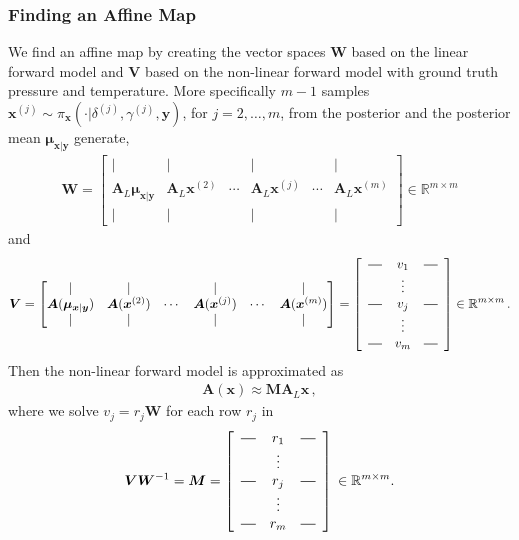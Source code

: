 \documentclass{article}
\begin{document}
\subsubsection{Finding an Affine Map}
\label{sec:affine}
We find an affine map by creating the vector spaces $\bm{W}$ based on the linear forward model and $\bm{V}$ based on the non-linear forward model with ground truth pressure and temperature.
More specifically $m-1$ samples $\bm{x}^{(j)} \sim \pi_{\bm{x}}(\cdot|\delta^{(j)} , \gamma^{(j)},\bm{y})$, for $j = 2, \dots,m$, from the posterior and the posterior mean $\bm{\mu}_{\bm{x}|\bm{y}}$ generate,
\begin{align*}
	\bm{W} = \begin{bmatrix}
		\vert& \vert&   &  \vert & & \vert \\
		\bm{A}_{L}  \bm{\mu}_{\bm{x}|\bm{y}} & \bm{A}_{L}  \bm{x}^{(2)}   &  \cdots& \bm{A}_{L} \bm{x}^{(j)} &  \cdots & \bm{A}_{L} \bm{x}^{(m)} \\
		\vert& \vert&   &  \vert & & \vert 
	\end{bmatrix}
	\in \mathbb{R}^{m \times m}
\end{align*}\noindent and
\begin{align*}
	\bm{V} = \begin{bmatrix}
		\vert& \vert&   &  \vert & & \vert \\
		\bm{A}(\bm{\mu}_{\bm{x}|\bm{y}} ) & \bm{A}(\bm{x}^{(2)}) &  \cdots& \bm{A}(\bm{x}^{(j)}) &  \cdots & \bm{A} (\bm{x}^{(m)})  \\
		\vert&\vert&   &  \vert & & \vert 
	\end{bmatrix} = 
	\begin{bmatrix}
		\begin{array}{ccc}
			\horzbar & v_{1} & \horzbar \\
			& \vdots    &          \\
			\horzbar & v_{j} & \horzbar \\
			& \vdots    &          \\
			\horzbar &v_{m} & \horzbar
		\end{array}
	\end{bmatrix}\in \mathbb{R}^{m \times m} \, .
\end{align*}
Then the non-linear forward model is approximated as 
\begin{align}
	\bm{A}(\bm{x}) \approx \bm{M A}_L \bm{x} \, , \label{eq:AffineM}
\end{align}
where we solve $v_j =r_j \bm{W}$ for each row $r_j$ in
\begin{align*}
	\bm{V}\bm{W}^{-1} = \bm{M} =
	\begin{bmatrix}
		\begin{array}{ccc}
			\horzbar & r_{1} & \horzbar \\
			& \vdots    &          \\
			\horzbar & r_{j} & \horzbar \\
			& \vdots    &          \\
			\horzbar &r_{m} & \horzbar
		\end{array}
	\end{bmatrix}\, \in \mathbb{R}^{m \times m} .
\end{align*}
\end{document}
